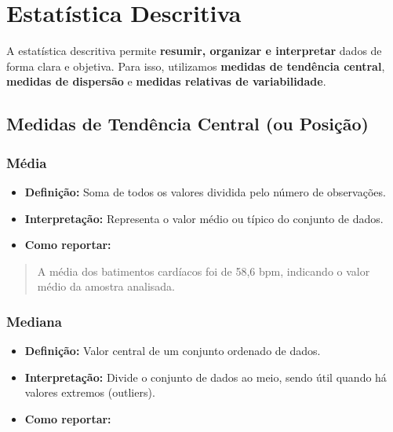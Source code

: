 \documentclass[
]{book}
\providecommand{\tightlist}{%
  \setlength{\itemsep}{0pt}\setlength{\parskip}{0pt}}
\begin{document}
\chapter{Estatística Descritiva}\label{estatuxedstica-descritiva-2}

A estatística descritiva permite \textbf{resumir, organizar e interpretar} dados de forma clara e objetiva. Para isso, utilizamos \textbf{medidas de tendência central}, \textbf{medidas de dispersão} e \textbf{medidas relativas de variabilidade}.

\section{Medidas de Tendência Central (ou Posição)}\label{medidas-de-tenduxeancia-central-ou-posiuxe7uxe3o}

\subsection{Média}\label{muxe9dia}

\begin{itemize}
\tightlist
\item
  \textbf{Definição:} Soma de todos os valores dividida pelo número de observações.\\
\item
  \textbf{Interpretação:} Representa o valor médio ou típico do conjunto de dados.\\
\item
  \textbf{Como reportar:}
\end{itemize}

\begin{quote}
A média dos batimentos cardíacos foi de 58,6 bpm, indicando o valor médio da amostra analisada.
\end{quote}

\subsection{Mediana}\label{mediana}

\begin{itemize}
\tightlist
\item
  \textbf{Definição:} Valor central de um conjunto ordenado de dados.\\
\item
  \textbf{Interpretação:} Divide o conjunto de dados ao meio, sendo útil quando há valores extremos (outliers).\\
\item
  \textbf{Como reportar:}
\end{itemize}
\end{document}
